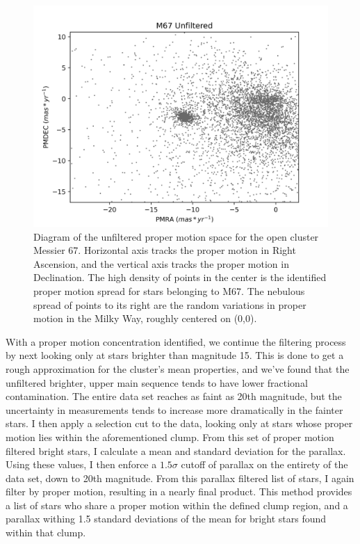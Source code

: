 \documentclass[onecolumn,table,xcdraw,super]{aastex631}
\begin{document}
\begin{figure}[]
	\centering
      \includegraphics[width=4.75in]{figures/M67_pm_unfiltered.png}
	\caption{Diagram of the unfiltered proper motion space for the open cluster Messier 67. Horizontal axis tracks the proper motion in Right Ascension, and the vertical axis tracks the proper motion in Declination. The high density of points in the center is the identified proper motion spread for stars belonging to M67. The nebulous spread of points to its right are the random variations in proper motion in the Milky Way, roughly centered on (0,0).}
	\label{fig:M67_pm_unfiltered}
\end{figure}

With a proper motion concentration identified, we continue the filtering process by next looking only at stars brighter than magnitude 15. This is done to get a rough approximation for the cluster's mean properties, and we've found that the unfiltered brighter, upper main sequence tends to have lower fractional contamination. The entire data set reaches as faint as 20th magnitude, but the uncertainty in measurements tends to increase more dramatically in the fainter stars. I then apply a selection cut to the data, looking only at stars whose proper motion lies within the aforementioned clump. From this set of proper motion filtered bright stars, I calculate a mean and standard deviation for the parallax. Using these values, I then enforce a $1.5\sigma$ cutoff of parallax on the entirety of the data set, down to 20th magnitude. From this parallax filtered list of stars, I again filter by proper motion, resulting in a nearly final product. This method provides a list of stars who share a proper motion within the defined clump region, and a parallax withing 1.5 standard deviations of the mean for bright stars found within that clump.
\end{document}

